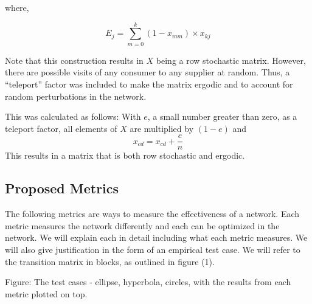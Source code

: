 \documentclass[twoside,twocolumn]{article}
\begin{document}
where, 

$$E_j = \sum_{m=0}^{k} (1-x_{mm})\times x_{kj}$$

Note that this construction results in $X$ being a row stochastic matrix.
However, there are possible visits of any consumer to any supplier at random.
Thus, a ``teleport'' factor was included to make the matrix ergodic and to account for random perturbations in the network.

This was calculated as follows:
With $e$, a small number greater than zero, as a teleport factor, all elements of $X$ are multiplied by $(1-e)$ and 
$$x_{cd} = x_{cd} + \frac{e}{n}$$
This results in a matrix that is both row stochastic and ergodic.








\subsection{Proposed Metrics}
The following metrics are ways to measure the effectiveness of a network.
Each metric measures the network differently and each can be optimized in the network.
We will explain each in detail including what each metric measures.
We will also give justification in the form of an empirical test case.
We will refer to the transition matrix in blocks, as outlined in figure (1).


Figure: The test cases - ellipse, hyperbola, circles, with the results from each metric plotted on top.
\end{document}
